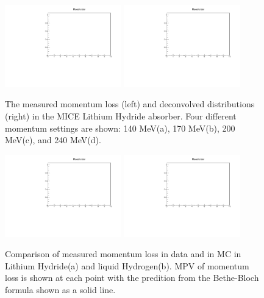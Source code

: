 \begin{figure}
\includegraphics[width=0.45\textwidth]{11-Absorber/Figures/placeholder.pdf}\hfil
\includegraphics[width=0.45\textwidth]{11-Absorber/Figures/placeholder.pdf}
\caption{\label{fig:eloss_data} The measured momentum loss (left) and deconvolved distributions (right) in the MICE Lithium Hydride absorber.  Four different momentum settings are shown: 140 MeV(a), 170 MeV(b), 200 MeV(c), and 240 MeV(d).}
\end{figure}

\begin{figure}
\includegraphics[width=0.45\textwidth]{11-Absorber/Figures/placeholder.pdf}\hfil
\includegraphics[width=0.45\textwidth]{11-Absorber/Figures/placeholder.pdf}

\caption{\label{fig:eloss_bb} Comparison of measured momentum loss in data and in MC in Lithium Hydride(a) and liquid Hydrogen(b).  MPV of momentum loss is shown at each point with the predition from the Bethe-Bloch formula shown as a solid line.}
\end{figure}


